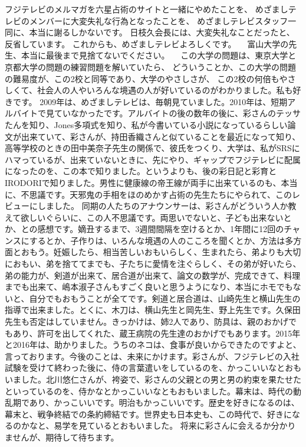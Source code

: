 \documentclass{jsarticle}
\begin{document}
  フジテレビのメルマガを六星占術のサイトと一緒にやめたことを、
  めざましテレビのメンバーに大変失礼な行為となったことを、
  めざましテレビスタッフ一同に、本当に謝るしかないです。
  日枝久会長には、大変失礼なことだったと、反省しています。
  これからも、めざましテレビよろしくです。 
　富山大学の先生、本当に最後まで見捨てないでください。
　この大学の問題は、東京大学と京都大学の問題の練習問題を解いていたら、
どういうことか、この大学の問題の難易度が、この2校と同等であり、大学のやさしさが、
この2校の何倍もやさしくて、社会人の人やいろんな境遇の人が好いているのがわかりました。私も好きです。
2009年は、めざましテレビは、毎朝見ていました。2010年は、短期アルバイトで見ていなかったです。アルバイトの後の数年の後に、彩さんのテッサたんを知り、Jones多項式を知り、私が今書いている小説になっているらしい論文が出来ていて、彩さんが、持田香織さんと似ていることを最近になって知り、高等学校のときの田中美奈子先生の関係で、彼氏をつくり、大学は、私がSRSにハマっているが、出来ていないときに、先にやり、ギャップでフジテレビに配属になったのを、この本で知りました。というよりも、後の彩日記と彩育とIRODORIで知りました。男性に健康線の帝王線が両手に出来ているのも、本当に、不思議です。天邪鬼の手相をほのめかす占術の先生たちにやられて、このレビューにしました。
同期の人たちのアナウンサーは、彩さんがどういう人か教えて欲しいぐらいに、この人不思議です。両思いでないと、子ども出来ないとか、との感想です。嫡丑するまで、3週間間隔を空けるとか、1年間に12回のチャンスにするとか、子作りは、いろんな境遇の人のこころを聞くとか、方法は多方面とおもう。妊娠したら、相当苦しいおもいらしく、生まれたら、弟よりも大切におもい、弟を捨ててまでも、子たちに愛情を注ぐらしく、その弟が好いたら、弟の能力が、剣道が出来て、居合道が出来て、論文の数学が、完成できて、料理までも出来て、嶋本淑子さんもすごく良いと思うようになり、本当にホモでもないと、自分でもおもうことが全てです。剣道と居合道は、山崎先生と横山先生の指導で出来ました。とくに、木刀は、横山先生と岡先生、野上先生です。久保田先生も否定はしていません。きっかけは、姉2人であり、防具は、親のおかげでもあり、許可を出してくれた、蔵王病院の先生達のおかげでもあります。2015年と2016年は、助かりました。うちのネコは、食事が良いからできたのですよと、言っております。今後のことは、未来にかけます。彩さんが、フジテレビの入社試験を受けて終わった後に、侍の言葉遣いをしているのを、かっこいいなとおもいました。北川悠仁さんが、袴姿で、彩さんの父親との男と男の約束を果たせたといっているのを、侍かなとかっこいいなともおもいました。幕末は、時代の動乱期であり、かっこいいです。明治もかっこいいです。歴史を好きになるのは、幕末と、戦争終結での条約締結です。世界史も日本史も、この時代で、好きになるのかなと、易学を見ているとおもいました。
将来に彩さんに会えるか分かりませんが、期待して待ちます。
\end{document}
